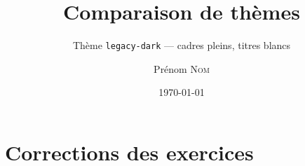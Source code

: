 \documentclass[11pt]{ocots-book}
\title{Comparaison de thèmes}
\subtitle{Thème \texttt{legacy-dark} — cadres pleins, titres blancs}
\author{Prénom \textsc{Nom}}
\date{\today}
\begin{document}
\maketitle

\ocotscollectsolutions%





\chapter{Corrections des exercices}
\ocotsprintsolutions%



\end{document}
